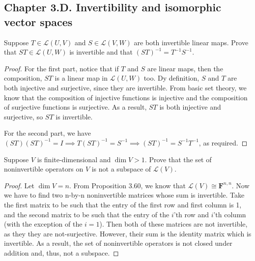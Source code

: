 \subsection*{Chapter 3.D. Invertibility and isomorphic vector spaces}


\begin{exercise}{1}
  Suppose $T\in\mathcal{L}(U,V)$ and $S\in\mathcal{L}(V,W)$ are both invertible linear maps. 
  Prove that $ST\in\mathcal{L}(U,W)$ is invertible and that $(ST)^{-1}=T^{-1}S^{-1}$.
\end{exercise}
\begin{proof}
 For the first part, notice that if $T$ and $S$ are linear maps, then the composition, $ST$ is a linear map in $\mathcal{L}(U,W)$ too. 
 Dy definition, $S$ and $T$ are both injective and surjective, since they are invertible. 
 From basic set theory, we know that the composition of injective functions is injective and the composition of surjective functions is surjective. 
 As a result, $ST$ is both injective and surjective, so $ST$ is invertible.
 
 For the second part, we have $(ST)(ST)^{-1}=I \implies T(ST)^{-1}=S^{-1} \implies (ST)^{-1}=S^{-1}T^{-1}$, as required.
\end{proof}


\begin{exercise}{2}
  Suppose $V$ is finite-dimensional and $\dim V>1$. Prove that the set of noninvertible operators on $V$ is not a subspace of $\mathcal{L}(V)$.
\end{exercise}
\begin{proof}
 Let $\dim V=n$. From Proposition 3.60, we know that $\mathcal{L}(V)\cong\mathbf{F}^{n,n}$. Now we have to find two n-by-n noninvertible matrices whose sum is invertible. Take the first matrix to be such that the entry of the first row and first column is 1, and the second matrix to be such that the entry of the $i$'th row and $i$'th column (with the exception of the $i=1$). Then both of these matrices are not invertible, as they they are not-surjective. However, their sum is the identity matrix which is invertible. As a result, the set of noninvertible operators is not closed under addition and, thus, not a subspace.
\end{proof}


